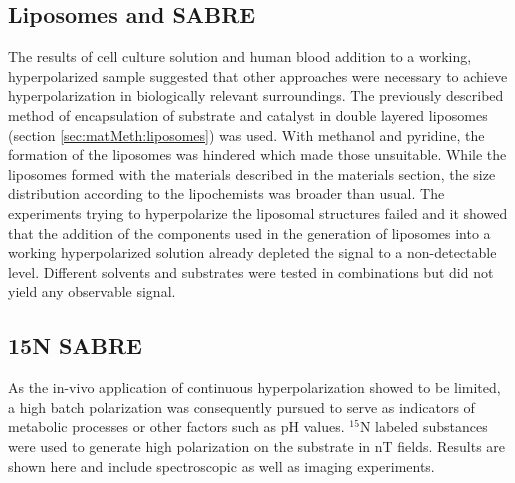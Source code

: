     \subsection{Liposomes and SABRE}
    \label{sec:results:liposomes}
    The results of cell culture solution and human blood addition to a working, hyperpolarized sample suggested that other approaches were necessary to achieve hyperpolarization in biologically relevant surroundings. The previously described method of encapsulation of substrate and catalyst in double layered liposomes (section \ref{sec:matMeth:liposomes}) was used. With methanol and pyridine, the formation of the liposomes was hindered which made those unsuitable. While the liposomes formed with the materials described in the materials section, the size distribution according to the lipochemists was broader than usual. The experiments trying to hyperpolarize the liposomal structures failed and it showed that the addition of the components used in the generation of liposomes into a working hyperpolarized solution already depleted the signal to a non-detectable level. Different solvents and substrates were tested in combinations but did not yield any observable signal.  
    \subsection{15N SABRE}
        As the in-vivo application of continuous hyperpolarization showed to be limited, a high batch polarization was consequently pursued to serve as indicators of metabolic processes or other factors such as pH values.
        $^{15}\mathrm{N}$ labeled substances were used to generate high polarization on the substrate in \si{\nano\tesla} fields. Results are shown here and include spectroscopic as well as imaging experiments.
